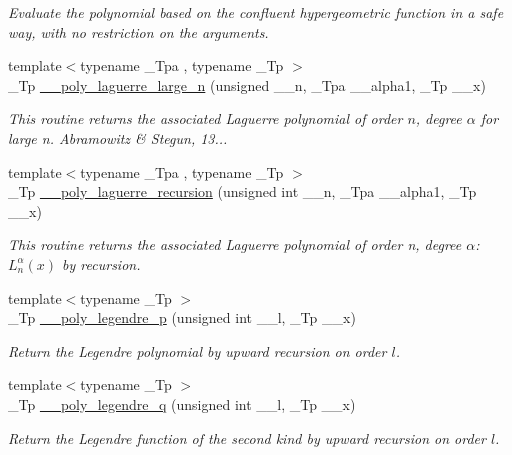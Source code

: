 \begin{DoxyCompactItemize}
\begin{DoxyCompactList}\small\item\em Evaluate the polynomial based on the confluent hypergeometric function in a safe way, with no restriction on the arguments. \end{DoxyCompactList}\item 
{\footnotesize template$<$typename \+\_\+\+Tpa , typename \+\_\+\+Tp $>$ }\\\+\_\+\+Tp \hyperlink{namespacestd_1_1____detail_a1f9e78deb2bcc73511c77dcb1cdcf4c8}{\+\_\+\+\_\+poly\+\_\+laguerre\+\_\+large\+\_\+n} (unsigned \+\_\+\+\_\+n, \+\_\+\+Tpa \+\_\+\+\_\+alpha1, \+\_\+\+Tp \+\_\+\+\_\+x)
\begin{DoxyCompactList}\small\item\em This routine returns the associated Laguerre polynomial of order $ n $, degree $ \alpha $ for large n. Abramowitz \& Stegun, 13... \end{DoxyCompactList}\item 
{\footnotesize template$<$typename \+\_\+\+Tpa , typename \+\_\+\+Tp $>$ }\\\+\_\+\+Tp \hyperlink{namespacestd_1_1____detail_a6d3a7499bd109d5c0ea01e85f3165730}{\+\_\+\+\_\+poly\+\_\+laguerre\+\_\+recursion} (unsigned int \+\_\+\+\_\+n, \+\_\+\+Tpa \+\_\+\+\_\+alpha1, \+\_\+\+Tp \+\_\+\+\_\+x)
\begin{DoxyCompactList}\small\item\em This routine returns the associated Laguerre polynomial of order {\ttfamily n}, degree {\ttfamily $ \alpha $}\+: $ L_n^\alpha(x) $ by recursion. \end{DoxyCompactList}\item 
{\footnotesize template$<$typename \+\_\+\+Tp $>$ }\\\+\_\+\+Tp \hyperlink{namespacestd_1_1____detail_ad340d3fb1a429356292e7dcf61348c8a}{\+\_\+\+\_\+poly\+\_\+legendre\+\_\+p} (unsigned int \+\_\+\+\_\+l, \+\_\+\+Tp \+\_\+\+\_\+x)
\begin{DoxyCompactList}\small\item\em Return the Legendre polynomial by upward recursion on order $ l $. \end{DoxyCompactList}\item 
{\footnotesize template$<$typename \+\_\+\+Tp $>$ }\\\+\_\+\+Tp \hyperlink{namespacestd_1_1____detail_aa810a501ad591480559e9f10d1b18e0f}{\+\_\+\+\_\+poly\+\_\+legendre\+\_\+q} (unsigned int \+\_\+\+\_\+l, \+\_\+\+Tp \+\_\+\+\_\+x)
\begin{DoxyCompactList}\small\item\em Return the Legendre function of the second kind by upward recursion on order $ l $. \end{DoxyCompactList}\item 

\end{DoxyCompactItemize}
